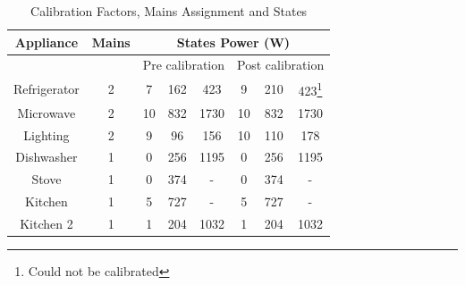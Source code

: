 \documentclass[conference]{IEEEtran}
\begin{document}
\begin{table}
\caption{Calibration Factors, Mains Assignment and States}
\label{tab:calibration_factors}
\begin{tabular}{|c|c|c|c|c|c|c|c|}
\hline
Appliance & Mains & \multicolumn{6}{|c|}{States Power (W)}\\
\hline
&&\multicolumn{3}{|c|}{Pre calibration}&\multicolumn{3}{|c|}{Post calibration}\\
\hline
Refrigerator & 2& 7&162&423 & 9&210&423\footnote{Could not be calibrated}\\
Microwave &2& 10&832&1730& 10&832&1730\\
Lighting & 2& 9&96&156&10&110&178\\
Dishwasher & 1& 0&256& 1195 & 0&256& 1195\\
Stove& 1 & 0&374&-& 0&374&-\\
Kitchen & 1& 5&727&-&5&727&-\\
Kitchen 2&1 & 1&204&1032&1&204&1032 \\
%
%
\hline
%
\end{tabular}
\end{table}
\end{document}
